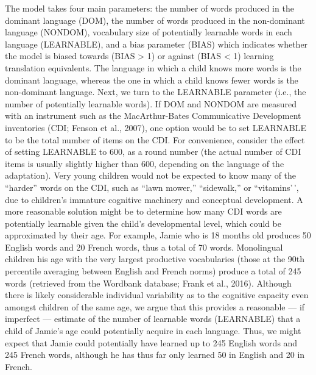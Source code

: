 \documentclass[
  english,
  ,man,floatsintext]{apa6}
\begin{document}
The model takes four main parameters: the number of words produced in the dominant language (DOM), the number of words produced in the non-dominant language (NONDOM), vocabulary size of potentially learnable words in each language (LEARNABLE), and a bias parameter (BIAS) which indicates whether the model is biased towards (BIAS \textgreater{} 1) or against (BIAS \textless{} 1) learning translation equivalents. The language in which a child knows more words is the dominant language, whereas the one in which a child knows fewer words is the non-dominant language.
Next, we turn to the LEARNABLE parameter (i.e., the number of potentially learnable words). If DOM and NONDOM are measured with an instrument such as the MacArthur-Bates Communicative Development inventories (CDI; Fenson et al., 2007), one option would be to set LEARNABLE to be the total number of items on the CDI. For convenience, consider the effect of setting LEARNABLE to 600, as a round number (the actual number of CDI items is usually slightly higher than 600, depending on the language of the adaptation). Very young children would not be expected to know many of the ``harder'' words on the CDI, such as ``lawn mower,'' ``sidewalk,'' or ``vitamins'\,', due to children's immature cognitive machinery and conceptual development. A more reasonable solution might be to determine how many CDI words are potentially learnable given the child's developmental level, which could be approximated by their age. For example, Jamie who is 18 months old produces 50 English words and 20 French words, thus a total of 70 words. Monolingual children his age with the very largest productive vocabularies (those at the 90th percentile averaging between English and French norms) produce a total of 245 words (retrieved from the Wordbank database; Frank et al., 2016). Although there is likely considerable individual variability as to the cognitive capacity even amongst children of the same age, we argue that this provides a reasonable --- if imperfect --- estimate of the number of learnable words (LEARNABLE) that a child of Jamie's age could potentially acquire in each language. Thus, we might expect that Jamie could potentially have learned up to 245 English words and 245 French words, although he has thus far only learned 50 in English and 20 in French.
\end{document}
